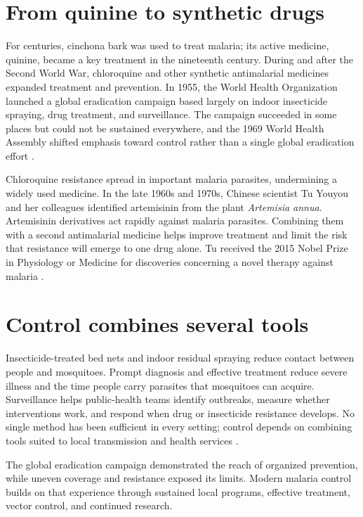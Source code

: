 \documentclass[12pt,oneside]{book}
\begin{document}
\section{From quinine to synthetic drugs}
For centuries, cinchona bark was used to treat malaria; its active medicine,
quinine, became a key treatment in the nineteenth century. During and after
the Second World War, chloroquine and other synthetic antimalarial medicines
expanded treatment and prevention. In 1955, the World Health Organization
launched a global eradication campaign based largely on indoor insecticide
spraying, drug treatment, and surveillance. The campaign succeeded in some
places but could not be sustained everywhere, and the 1969 World Health
Assembly shifted emphasis toward control rather than a single global
eradication effort \cite{cdcMalariaHistory,whoMalariaHistory}.

Chloroquine resistance spread in important malaria parasites, undermining a
widely used medicine. In the late 1960s and 1970s, Chinese scientist Tu
Youyou and her colleagues identified artemisinin from the plant
\emph{Artemisia annua}. Artemisinin derivatives act rapidly against malaria
parasites. Combining them with a second antimalarial medicine helps improve
treatment and limit the risk that resistance will emerge to one drug alone.
Tu received the 2015 Nobel Prize in Physiology or Medicine for discoveries
concerning a novel therapy against malaria \cite{nobelArtemisinin,cdcMalariaTreatment}.

\section{Control combines several tools}
Insecticide-treated bed nets and indoor residual spraying reduce contact
between people and mosquitoes. Prompt diagnosis and effective treatment
reduce severe illness and the time people carry parasites that mosquitoes
can acquire. Surveillance helps public-health teams identify outbreaks,
measure whether interventions work, and respond when drug or insecticide
resistance develops. No single method has been sufficient in every setting;
control depends on combining tools suited to local transmission and health
services \cite{whoMalariaHistory,cdcMalariaTreatment}.

The global eradication campaign demonstrated the reach of organized
prevention, while uneven coverage and resistance exposed its limits. Modern
malaria control builds on that experience through sustained local programs,
effective treatment, vector control, and continued research.
\end{document}
